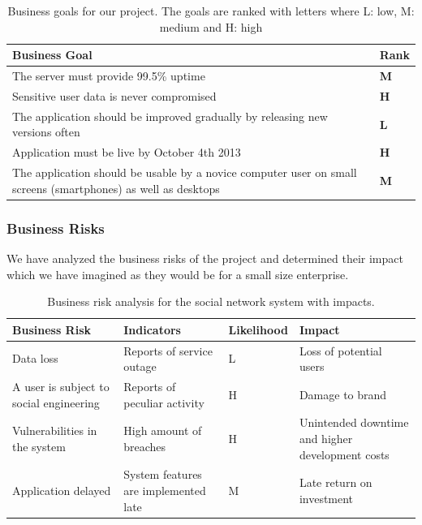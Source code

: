\documentclass[a4paper]{article}
\begin{document}
\begin{table}[h!]
	\begin{tabular}{|p{10cm}|l|}
		\hline
		\textbf{Business Goal} & \textbf{Rank} \\ \hline
		The server must provide 99.5\% uptime   & \textbf{M} \\ \hline
		Sensitive user data is never compromised & \textbf{H} \\ \hline
		The application should be improved gradually by releasing new versions often & \textbf{L} \\ \hline
		Application must be live by October 4th 2013 &	\textbf{H}\\ \hline
		The application should be usable by a novice computer user on small screens (smartphones) as well as desktops & \textbf{M}\\ \hline
	\end{tabular}
	\caption{Business goals for our project. The goals are ranked with letters where L: low, M: medium and H: high}
	\label{tab:business_goals}
\end{table}

\subsubsection{Business Risks}
We have analyzed the business risks of the project and determined their impact which we have imagined as they would be for a small size enterprise.
\begin{table}[h!]
\begin{tabular}{| p{4cm} | p{3cm} | l | p{3cm} |}
\hline
\textbf{Business Risk} & \textbf{Indicators} & \textbf{Likelihood} & \textbf{Impact} \\ \hline
Data loss & Reports of service outage & L & Loss of potential users\\\hline
A user is subject to social engineering & Reports of peculiar activity & H & Damage to brand \\\hline
Vulnerabilities in the system & High amount of breaches & H & Unintended downtime and higher development costs \\\hline
Application delayed & System features are implemented late & M & Late return on investment \\\hline
\end{tabular}
	\caption{Business risk analysis for the social network system with impacts.}
		\label{tab:business_risk_analysis}
\end{table}
\end{document}
